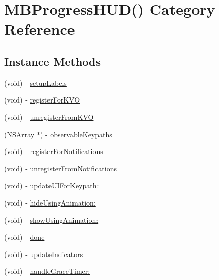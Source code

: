 \hypertarget{category_m_b_progress_h_u_d_07_08}{\section{M\+B\+Progress\+H\+U\+D() Category Reference}
\label{category_m_b_progress_h_u_d_07_08}
}
\subsection*{Instance Methods}
\begin{DoxyCompactItemize}
\item 
(void) -\/ \hyperlink{category_m_b_progress_h_u_d_07_08_afdd98061febe4c70612ec90781072666}{setup\+Labels}
\item 
(void) -\/ \hyperlink{category_m_b_progress_h_u_d_07_08_ab854d39884bfbab11016768cd963c149}{register\+For\+K\+V\+O}
\item 
(void) -\/ \hyperlink{category_m_b_progress_h_u_d_07_08_af2d221a723e70926a82f8f676d5fc14d}{unregister\+From\+K\+V\+O}
\item 
(N\+S\+Array $\ast$) -\/ \hyperlink{category_m_b_progress_h_u_d_07_08_abc52ed122a077567f45667fb2e229d99}{observable\+Keypaths}
\item 
(void) -\/ \hyperlink{category_m_b_progress_h_u_d_07_08_a69ef8d11e37509cd6153008561495748}{register\+For\+Notifications}
\item 
(void) -\/ \hyperlink{category_m_b_progress_h_u_d_07_08_a48798d7cd00acabbf68c3042359ee26d}{unregister\+From\+Notifications}
\item 
(void) -\/ \hyperlink{category_m_b_progress_h_u_d_07_08_a1a10daf9c000912334350f6436793334}{update\+U\+I\+For\+Keypath\+:}
\item 
(void) -\/ \hyperlink{category_m_b_progress_h_u_d_07_08_aa3a0b42eeeb2df228793b32806af1883}{hide\+Using\+Animation\+:}
\item 
(void) -\/ \hyperlink{category_m_b_progress_h_u_d_07_08_a1d81696b9e99cce3e4291c7a5e7ca13f}{show\+Using\+Animation\+:}
\item 
(void) -\/ \hyperlink{category_m_b_progress_h_u_d_07_08_ac2a1bbca15d4c98346db20c155252e1f}{done}
\item 
(void) -\/ \hyperlink{category_m_b_progress_h_u_d_07_08_a0c6fd8c9f5579d07ee037f1db6113152}{update\+Indicators}
\item 
(void) -\/ \hyperlink{category_m_b_progress_h_u_d_07_08_ac171139695b879a83d4b27c383dacf1a}{handle\+Grace\+Timer\+:}
\item 

\end{DoxyCompactItemize}
